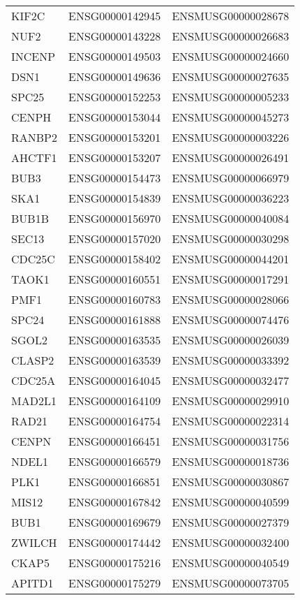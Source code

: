 \begin{longtable}{lll}
    KIF2C & ENSG00000142945 & ENSMUSG00000028678 \\
    NUF2 & ENSG00000143228 & ENSMUSG00000026683 \\
    INCENP & ENSG00000149503 & ENSMUSG00000024660 \\
    DSN1 & ENSG00000149636 & ENSMUSG00000027635 \\
    SPC25 & ENSG00000152253 & ENSMUSG00000005233 \\
    CENPH & ENSG00000153044 & ENSMUSG00000045273 \\
    RANBP2 & ENSG00000153201 & ENSMUSG00000003226 \\
    AHCTF1 & ENSG00000153207 & ENSMUSG00000026491 \\
    BUB3 & ENSG00000154473 & ENSMUSG00000066979 \\
    SKA1 & ENSG00000154839 & ENSMUSG00000036223 \\
    BUB1B & ENSG00000156970 & ENSMUSG00000040084 \\
    SEC13 & ENSG00000157020 & ENSMUSG00000030298 \\
    CDC25C & ENSG00000158402 & ENSMUSG00000044201 \\
    TAOK1 & ENSG00000160551 & ENSMUSG00000017291 \\
    PMF1 & ENSG00000160783 & ENSMUSG00000028066 \\
    SPC24 & ENSG00000161888 & ENSMUSG00000074476 \\
    SGOL2 & ENSG00000163535 & ENSMUSG00000026039 \\
    CLASP2 & ENSG00000163539 & ENSMUSG00000033392 \\
    CDC25A & ENSG00000164045 & ENSMUSG00000032477 \\
    MAD2L1 & ENSG00000164109 & ENSMUSG00000029910 \\
    RAD21 & ENSG00000164754 & ENSMUSG00000022314 \\
    CENPN & ENSG00000166451 & ENSMUSG00000031756 \\
    NDEL1 & ENSG00000166579 & ENSMUSG00000018736 \\
    PLK1 & ENSG00000166851 & ENSMUSG00000030867 \\
    MIS12 & ENSG00000167842 & ENSMUSG00000040599 \\
    BUB1 & ENSG00000169679 & ENSMUSG00000027379 \\
    ZWILCH & ENSG00000174442 & ENSMUSG00000032400 \\
    CKAP5 & ENSG00000175216 & ENSMUSG00000040549 \\
    APITD1 & ENSG00000175279 & ENSMUSG00000073705 \\

\end{longtable}
